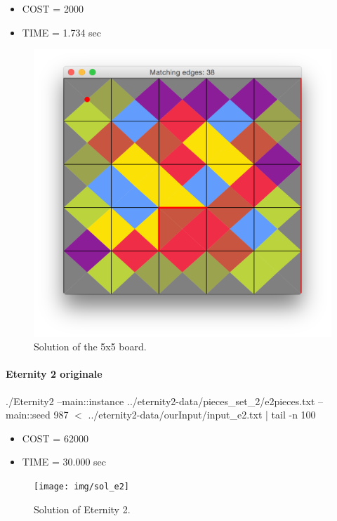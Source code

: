 	\begin{itemize}
		\item COST = 2000
		\item TIME = 1.734 sec
	\end{itemize}
	\begin{figure}[H]
	\centering
	\includegraphics[scale=0.25]{img/sol_05x05}
	\caption{Solution of the 5x5 board.}
	\end{figure}


	\paragraph{Eternity 2 originale}
	./Eternity2 --main::instance ../eternity2-data/pieces\_set\_2/e2pieces.txt --main::seed 987 $<$ ../eternity2-data/ourInput/input\_e2.txt | tail -n 100

	\begin{itemize}
		\item COST = 62000
		\item TIME = 30.000 sec
	\end{itemize}
	\begin{figure}[H]
	\centering
	\texttt{[image: img/sol\_e2]}
	\caption{Solution of Eternity 2.}
	\end{figure}














